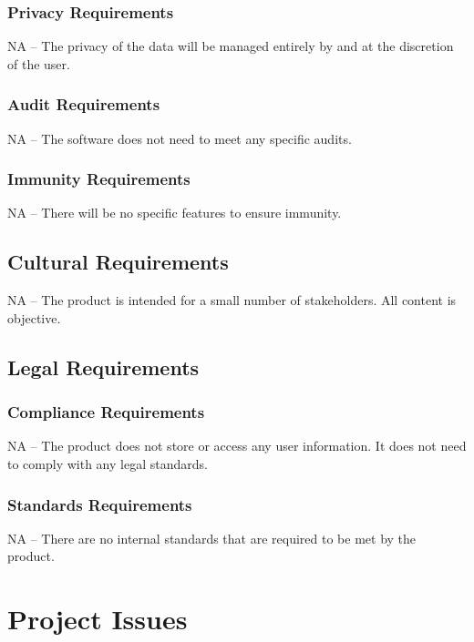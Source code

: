 \documentclass[12pt]{article}
\begin{document}
\subsubsection{Privacy Requirements}
NA -- The privacy of the data will be managed entirely by and at the discretion of the user.


\subsubsection{Audit Requirements}
NA -- The software does not need to meet any specific audits.

\subsubsection{Immunity Requirements}
NA -- There will be no specific features to ensure immunity.


\subsection{Cultural Requirements} %
NA -- The product is intended for a small number of stakeholders. All content is objective.

\subsection{Legal Requirements} %
\subsubsection{Compliance Requirements}
NA -- The product does not store or access any user information. It does not need to comply with any legal standards.

\subsubsection{Standards Requirements}
NA -- There are no internal standards that are required to be met by the product.

\newpage
\section{Project Issues}
\end{document}
